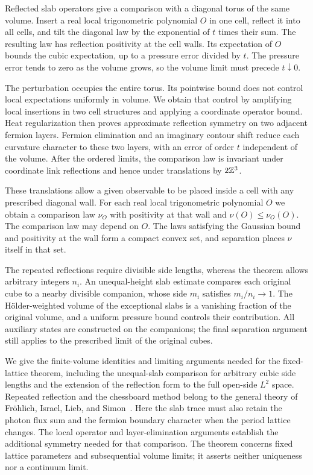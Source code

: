 Reflected slab operators give a comparison with a diagonal torus
of the same volume. Insert a real local trigonometric polynomial
$O$ in one cell, reflect it into all cells, and tilt the diagonal
law by the exponential of $t$ times their sum. The resulting law
has reflection positivity at the cell walls. Its expectation of
$O$ bounds the cubic expectation, up to a pressure error divided
by $t$. The pressure error tends to zero as the volume grows, so
the volume limit must precede $t\downarrow0$.

The perturbation occupies the entire torus. Its pointwise bound
does not control local expectations uniformly in volume. We obtain
that control by amplifying local insertions in two cell structures
and applying a coordinate operator bound. Heat regularization then
proves approximate reflection symmetry on two adjacent fermion
layers. Fermion elimination and an imaginary contour shift reduce
each curvature character to these two layers, with an error of
order $t$ independent of the volume. After the ordered limits,
the comparison law is invariant under coordinate link reflections
and hence under translations by $2\mathbb Z^3$.

These translations allow a given observable to be placed inside a
cell with any prescribed diagonal wall. For each real local
trigonometric polynomial $O$ we obtain a comparison law $\nu_O$
with positivity at that wall and
$\nu(O)\le\nu_O(O)$. The comparison law may depend on $O$.
The laws satisfying the Gaussian bound and positivity at the wall
form a compact convex set, and separation places $\nu$ itself in
that set.

The repeated reflections require divisible side lengths, whereas
the theorem allows arbitrary integers $n_i$. An unequal-height
slab estimate compares each original cube to a nearby divisible
companion, whose side $m_i$ satisfies $m_i/n_i\to1$. The H\"older-weighted
volume of the exceptional slabs is a vanishing fraction of the original
volume, and a uniform pressure bound controls their contribution. All auxiliary states
are constructed on the companions; the final separation argument
still applies to the prescribed limit of the original cubes.


We give the finite-volume identities and limiting arguments needed
for the fixed-lattice theorem, including the unequal-slab comparison
for arbitrary cubic side lengths and the extension of the reflection
form to the full open-side $L^2$ space. Repeated reflection and the
chessboard method belong to the general theory of Fr\"ohlich, Israel,
Lieb, and Simon~\cite[Section~4]{FILS1978}. Here the slab trace must also
retain the photon flux sum and the fermion boundary character when
the period lattice changes. The local operator and layer-elimination
arguments establish the additional symmetry needed for that comparison.
The theorem concerns fixed lattice parameters and subsequential volume
limits; it asserts neither uniqueness nor a continuum limit.
